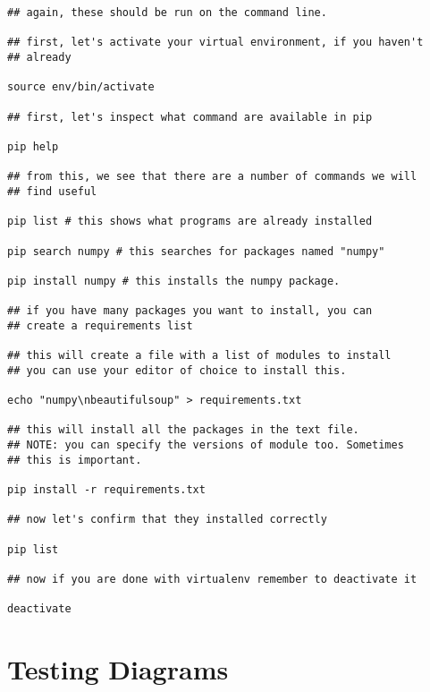 \documentclass[letterpaper,10pt,microtype]{article}
\begin{document}
\lstset{numbers=left,language=sh}
\begin{lstlisting}
## again, these should be run on the command line. 

## first, let's activate your virtual environment, if you haven't 
## already

source env/bin/activate

## first, let's inspect what command are available in pip

pip help

## from this, we see that there are a number of commands we will 
## find useful

pip list # this shows what programs are already installed

pip search numpy # this searches for packages named "numpy"

pip install numpy # this installs the numpy package. 

## if you have many packages you want to install, you can 
## create a requirements list

## this will create a file with a list of modules to install
## you can use your editor of choice to install this. 

echo "numpy\nbeautifulsoup" > requirements.txt

## this will install all the packages in the text file. 
## NOTE: you can specify the versions of module too. Sometimes
## this is important. 

pip install -r requirements.txt

## now let's confirm that they installed correctly

pip list 

## now if you are done with virtualenv remember to deactivate it

deactivate
\end{lstlisting}

\section{Testing Diagrams}
\label{sec-5}
\end{document}

